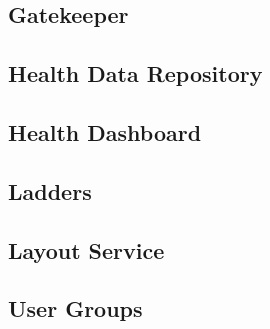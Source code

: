     \subsection{Gatekeeper}
    	
    \subsection{Health Data Repository}
    	
    \subsection{Health Dashboard}
    	
    \subsection{Ladders}
    	
    \subsection{Layout Service}
    	
    \subsection{User Groups}
    	